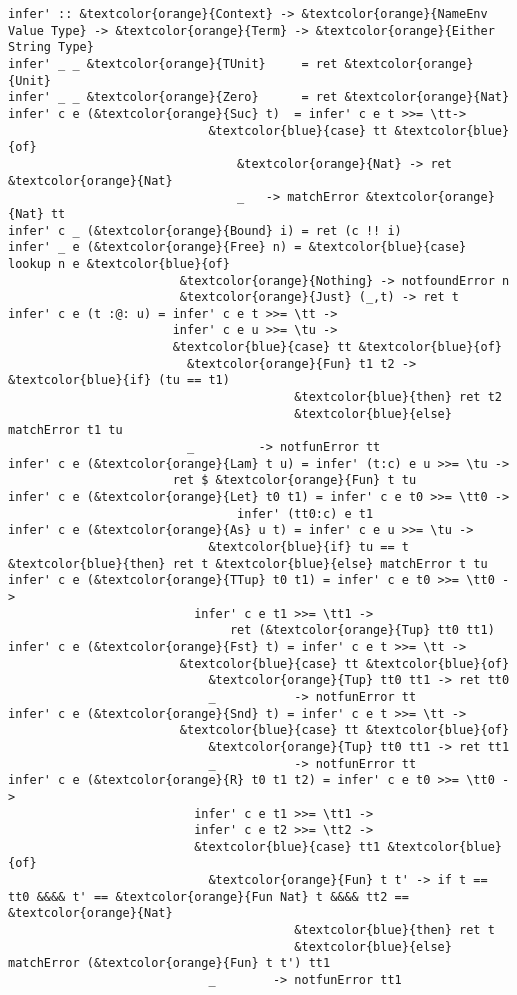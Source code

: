 \documentclass[12pt, a4paper]{article}
\begin{document}
\begin{Verbatim}[commandchars=\&\{\}]
infer' :: &textcolor{orange}{Context} -> &textcolor{orange}{NameEnv Value Type} -> &textcolor{orange}{Term} -> &textcolor{orange}{Either String Type}
infer' _ _ &textcolor{orange}{TUnit}     = ret &textcolor{orange}{Unit}
infer' _ _ &textcolor{orange}{Zero}      = ret &textcolor{orange}{Nat}
infer' c e (&textcolor{orange}{Suc} t)  = infer' c e t >>= \tt->
                            &textcolor{blue}{case} tt &textcolor{blue}{of}
                                &textcolor{orange}{Nat} -> ret &textcolor{orange}{Nat}
                                _   -> matchError &textcolor{orange}{Nat} tt
infer' c _ (&textcolor{orange}{Bound} i) = ret (c !! i)
infer' _ e (&textcolor{orange}{Free} n) = &textcolor{blue}{case} lookup n e &textcolor{blue}{of}
                        &textcolor{orange}{Nothing} -> notfoundError n
                        &textcolor{orange}{Just} (_,t) -> ret t
infer' c e (t :@: u) = infer' c e t >>= \tt -> 
                       infer' c e u >>= \tu ->
                       &textcolor{blue}{case} tt &textcolor{blue}{of}
                         &textcolor{orange}{Fun} t1 t2 -> &textcolor{blue}{if} (tu == t1) 
                                        &textcolor{blue}{then} ret t2
                                        &textcolor{blue}{else} matchError t1 tu
                         _         -> notfunError tt
infer' c e (&textcolor{orange}{Lam} t u) = infer' (t:c) e u >>= \tu ->
                       ret $ &textcolor{orange}{Fun} t tu
infer' c e (&textcolor{orange}{Let} t0 t1) = infer' c e t0 >>= \tt0 -> 
                                infer' (tt0:c) e t1
infer' c e (&textcolor{orange}{As} u t) = infer' c e u >>= \tu ->
                            &textcolor{blue}{if} tu == t &textcolor{blue}{then} ret t &textcolor{blue}{else} matchError t tu
infer' c e (&textcolor{orange}{TTup} t0 t1) = infer' c e t0 >>= \tt0 ->
                          infer' c e t1 >>= \tt1 ->
                               ret (&textcolor{orange}{Tup} tt0 tt1)
infer' c e (&textcolor{orange}{Fst} t) = infer' c e t >>= \tt ->
                        &textcolor{blue}{case} tt &textcolor{blue}{of}
                            &textcolor{orange}{Tup} tt0 tt1 -> ret tt0
                            _           -> notfunError tt
infer' c e (&textcolor{orange}{Snd} t) = infer' c e t >>= \tt ->
                        &textcolor{blue}{case} tt &textcolor{blue}{of}
                            &textcolor{orange}{Tup} tt0 tt1 -> ret tt1
                            _           -> notfunError tt
infer' c e (&textcolor{orange}{R} t0 t1 t2) = infer' c e t0 >>= \tt0 -> 
                          infer' c e t1 >>= \tt1 ->
                          infer' c e t2 >>= \tt2 ->
                          &textcolor{blue}{case} tt1 &textcolor{blue}{of}
                            &textcolor{orange}{Fun} t t' -> if t == tt0 &&&& t' == &textcolor{orange}{Fun Nat} t &&&& tt2 == &textcolor{orange}{Nat}
                                        &textcolor{blue}{then} ret t
                                        &textcolor{blue}{else} matchError (&textcolor{orange}{Fun} t t') tt1
                            _        -> notfunError tt1
\end{Verbatim}
\end{document}
